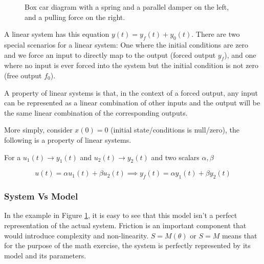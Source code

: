 \documentclass[11pt]{article}
\begin{document}
\begin{figure}[h]
\centering
{}
\caption{Box car diagram with a spring and a parallel damper on the left, and a pulling force on the right.}
\label{fig:box_car}
\end{figure}

A linear system has this equation $y(t) = y_f(t) + y_0 (t) $.
There are two special scenarios for a linear system:
One where the initial conditions are zero and we force an input to directly map to the output (forced output $y_f$),
and one where no input is ever forced into the system but the initial condition is not zero (free output $f_0$).

A property of linear systems is that, in the context of a forced output, any input can be represented as a linear combination of other inputs and the output will be the same linear combination of the corresponding outputs.

More simply, consider $x(0) = 0$ (initial state/conditions is null/zero), the following is a property of linear systems.

For a $u_1(t) \rightarrow y_1(t)$ and $u_2(t) \rightarrow y_2(t)$ and two scalars $\alpha, \beta$

\begin{equation}
    u(t) = \alpha u_1(t) + \beta u_2(t) \implies y_f(t) = \alpha y_1(t) + \beta y_2(t)
\end{equation}

\subsubsection{System Vs Model}
In the example in Figure \ref{fig:box_car}, it is easy to see that this model isn't a perfect representation of the actual system.
Friction is an important component that would introduce complexity and non-linearity.
$S = M(\theta)$ or $S=M$ means that for the purpose of the math exercise, the system is perfectly represented by its model and its parameters.
\end{document}
